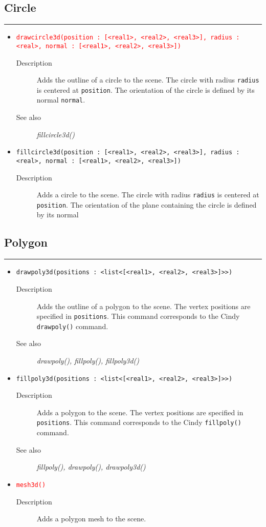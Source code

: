 \documentclass[10pt,a4widepaper]{scrartcl}
\newcommand{\csubsection}[1]{\subsection*{#1}\vspace{-0.55cm}\textcolor{CBlue}{\rule[1ex]{\textwidth}{0.4pt}}}
\newcommand{\cBlue}[1]{\textcolor{CBlue}{\texttt{#1}}}
\newcommand{\cRed}[1]{\textcolor{red}{\texttt{#1}}}
\newcommand{\desc}{\item[Description]}
\newcommand{\salso}{\item[See also]}
\begin{document}
\csubsection{Circle}
\begin{itemize}
\item \cRed{drawcircle3d(position : [<real1>, <real2>, <real3>], radius : <real>, normal : [<real1>, <real2>, <real3>])}
\begin{description}
\desc Adds the outline of a circle to the scene. The circle with radius \texttt{radius} is centered at \texttt{position}. The orientation of the circle is defined by its normal \texttt{normal}.
\salso \textit{fillcircle3d()}
\end{description}

\item \cBlue{fillcircle3d(position : [<real1>, <real2>, <real3>], radius : <real>, normal : [<real1>, <real2>, <real3>])}
\begin{description}
\desc Adds a circle to the scene. The circle with radius \texttt{radius} is centered at \texttt{position}. The orientation of the plane containing the circle is defined by its normal
\end{description}
\end{itemize}

\csubsection{Polygon}
\begin{itemize}

\item \cBlue{drawpoly3d(positions : <list<[<real1>, <real2>, <real3>]>>)}
\begin{description}
\desc Adds the outline of a polygon to the scene. The vertex positions are specified in \texttt{positions}. This command corresponds to the Cindy \texttt{drawpoly()} command.
\salso \textit{drawpoly(), fillpoly(), fillpoly3d()}
\end{description}

\item \cBlue{fillpoly3d(positions : <list<[<real1>, <real2>, <real3>]>>)}
\begin{description}
\desc Adds a polygon to the scene. The vertex positions are specified in \texttt{positions}. This command corresponds to the Cindy \texttt{fillpoly()} command.
\salso \textit{fillpoly(), drawpoly(), drawpoly3d()}
\end{description}

\item \cRed{mesh3d()}
\begin{description}
\desc Adds a polygon mesh to the scene.
\end{description}
\end{itemize}
\end{document}
